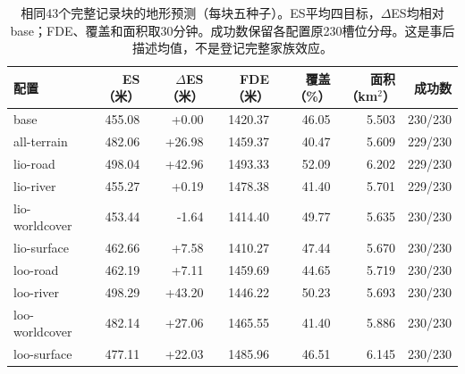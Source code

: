 \begin{table}[!htbp]\centering
\caption{相同43个完整记录块的地形预测（每块五种子）。ES平均四目标，$\Delta$ES均相对base；FDE、覆盖和面积取30分钟。成功数保留各配置原230槽位分母。这是事后描述均值，不是登记完整家族效应。}\label{tab:terrain-description}
\small\setlength{\tabcolsep}{3pt}
\begin{tabular}{lrrrrrr}\toprule
配置 & ES（米） & $\Delta$ES（米） & FDE（米） & 覆盖（\%） & 面积（km$^2$） & 成功数\\\midrule
base & 455.08 & +0.00 & 1420.37 & 46.05 & 5.503 & 230/230\\
all-terrain & 482.06 & +26.98 & 1459.37 & 40.47 & 5.609 & 229/230\\
lio-road & 498.04 & +42.96 & 1493.33 & 52.09 & 6.202 & 229/230\\
lio-river & 455.27 & +0.19 & 1478.38 & 41.40 & 5.701 & 229/230\\
lio-worldcover & 453.44 & -1.64 & 1414.40 & 49.77 & 5.635 & 230/230\\
lio-surface & 462.66 & +7.58 & 1410.27 & 47.44 & 5.670 & 230/230\\
loo-road & 462.19 & +7.11 & 1459.69 & 44.65 & 5.719 & 230/230\\
loo-river & 498.29 & +43.20 & 1446.22 & 50.23 & 5.693 & 230/230\\
loo-worldcover & 482.14 & +27.06 & 1465.55 & 41.40 & 5.886 & 230/230\\
loo-surface & 477.11 & +22.03 & 1485.96 & 46.51 & 6.145 & 230/230\\
\bottomrule\end{tabular}
\end{table}
